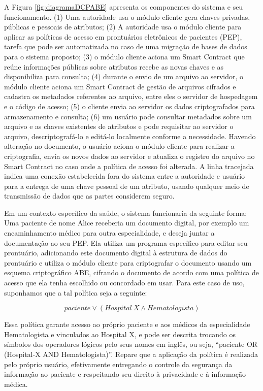 \documentclass[a4paper,11pt]{article}
\begin{document}
A Figura \ref{fig:diagramaDCPABE} apresenta os componentes do sistema e seu funcionamento.
(1) Uma autoridade usa o módulo cliente gera chaves privadas, públicas e pessoais de atributos;
(2) A autoridade usa o módulo cliente para aplicar as políticas de acesso em prontuários eletrônicos de pacientes (PEP), tarefa que pode ser automatizada no caso de uma migração de bases de dados para o sistema proposto;
(3) o módulo cliente aciona um Smart Contract que reúne informações públicas sobre atributos recebe as novas chaves e as disponibiliza para consulta;
(4) durante o envio de um arquivo ao servidor, o módulo cliente aciona um Smart Contract de gestão de arquivos cifrados e cadastra os metadados referentes ao arquivo, entre eles o servidor de hospedagem e o código de acesso;
(5) o cliente envia ao servidor os dados criptografados para armazenamento e consulta;
(6) um usuário pode consultar metadados sobre um arquivo e as chaves existentes de atributos e pode requisitar ao servidor o arquivo, descriptografá-lo e editá-lo localmente conforme a necessidade.
Havendo alteração no documento, o usuário aciona o módulo cliente para realizar a criptografia, envia os novos dados ao servidor e atualiza o registro do arquivo no Smart Contract no caso onde a política de acesso foi alterada.
A linha tracejada indica uma conexão estabelecida fora do sistema entre a autoridade e usuário para a entrega de uma chave pessoal de um atributo, usando qualquer meio de transmissão de dados que as partes considerem seguro.

Em um contexto específico da saúde, o sistema funcionaria da seguinte forma:
Uma paciente de nome Alice receberia um documento digital, por exemplo um encaminhamento médico para outra especialidade, e deseja juntar a documentação ao seu PEP.
Ela utiliza um programa específico para editar seu prontuário, adicionando este documento digital à estrutura de dados do prontuário e utiliza o módulo cliente para criptografar o documento usando um esquema criptográfico ABE, cifrando o documento de acordo com uma política de acesso que ela tenha escolhido ou concordado em usar.
Para este caso de uso, suponhamos que a tal política seja a seguinte:

\[paciente \vee (Hospital\ X \wedge Hematologista)\]

Essa política garante acesso ao próprio paciente e aos médicos da especialidade Hematologista e vinculados ao Hospital X, e pode ser descrita trocando os símbolos dos operadores lógicos pelo seus nomes em inglês, ou seja, ``paciente OR (Hospital-X AND Hematologista)''.
Repare que a aplicação da política é realizada pelo próprio usuário, efetivamente entregando o controle da segurança da informação ao paciente e respeitando seu direito à privacidade e à informação médica.
\end{document}

